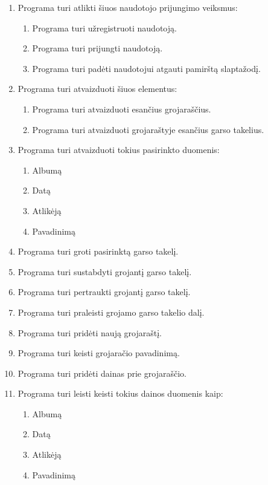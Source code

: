 \documentclass{VUMIFPSkursinis}
\begin{document}
\begin{enumerate}[start=1,label={\bfseries FR\arabic*}]
\item Programa turi atlikti šiuos naudotojo prijungimo veiksmus:
	\begin{enumerate}[start=1,label={\bfseries FR1.\arabic*}]
	\item Programa turi užregistruoti naudotoją.
	\item Programa turi prijungti naudotoją.
	\item Programa turi padėti naudotojui atgauti pamirštą slaptažodį.
	\end{enumerate}
\item Programa turi atvaizduoti šiuos elementus:
	\begin{enumerate}[start=1,label={\bfseries FR2.\arabic*}]
	\item Programa turi atvaizduoti esančius grojaraščius.
	\item Programa turi atvaizduoti grojaraštyje esančius garso takelius.
	\end{enumerate}
	\item Programa turi atvaizduoti tokius pasirinkto duomenis:
	\begin{enumerate}[start=1,label={\bfseries FR2.3.\arabic*}]
	\item Albumą
	\item Datą
	\item Atlikėją
	\item Pavadinimą
	\end{enumerate}
\item Programa turi groti pasirinktą garso takelį.
\item Programa turi sustabdyti grojantį garso takelį.
\item Programa turi pertraukti grojantį garso takelį.
\item Programa turi praleisti grojamo garso takelio dalį.
\item Programa turi pridėti naują grojaraštį.
\item Programa turi keisti grojaračio pavadinimą.
\item Programa turi pridėti dainas prie grojaraščio.
\item Programa turi leisti keisti tokius dainos duomenis kaip:
	\begin{enumerate}[start=1,label={\bfseries FR10.\arabic*}]
	\item Albumą
	\item Datą
	\item Atlikėją
	\item Pavadinimą

\end{enumerate}
\end{enumerate}
\end{document}
